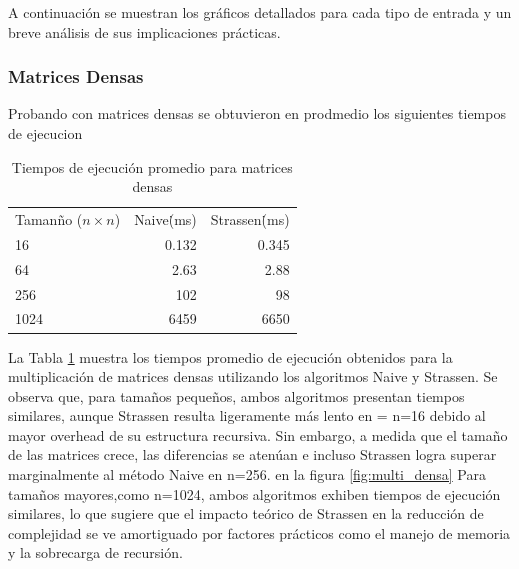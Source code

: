 A continuación se muestran los gráficos detallados para cada tipo de entrada y un breve análisis de sus implicaciones prácticas.

\subsubsection*{Matrices Densas}

Probando con matrices densas  se obtuvieron en prodmedio los siguientes tiempos de ejecucion

\begin{table}[ht]
  \centering
  \begin{tabular}{lrr}

    Tamanño ($n \times n$)  & Naive\.(ms) & Strassen\.(ms)\\

    16  & 0.132 & 0.345  \\
    64  & 2.63  & 2.88\\
    256& 102& 98\\
    1024& 6459 &  6650\\

  \end{tabular}
  \caption{Tiempos de ejecución promedio para matrices densas}
  \label{tab:sorting-results4}
\end{table}

La Tabla \ref{tab:sorting-results4} muestra los tiempos promedio de ejecución obtenidos para la multiplicación de matrices densas utilizando los algoritmos Naive y Strassen. Se observa que, para tamaños pequeños, ambos algoritmos presentan tiempos similares, aunque Strassen resulta ligeramente más lento en =
n=16 debido al mayor overhead de su estructura recursiva. Sin embargo, a medida que el tamaño de las matrices crece, las diferencias se atenúan e incluso Strassen logra superar marginalmente al método Naive en n=256. en la figura \ref{fig:multi_densa} Para tamaños mayores,como n=1024, ambos algoritmos exhiben tiempos de ejecución similares, lo que sugiere que el impacto teórico de Strassen en la reducción de complejidad se ve amortiguado por factores prácticos como el manejo de memoria y la sobrecarga de recursión.

